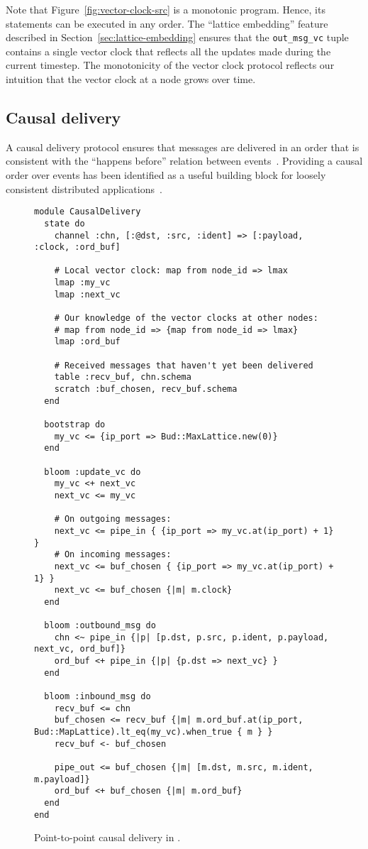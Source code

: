 Note that Figure~\ref{fig:vector-clock-src} is a monotonic program. Hence, its
statements can be executed in any order. The ``lattice embedding'' feature
described in Section~\ref{sec:lattice-embedding} ensures that the
\texttt{out\_msg\_vc} tuple contains a single vector clock that reflects all the
updates made during the current timestep. The monotonicity of the vector clock
protocol reflects our intuition that the vector clock at a node grows over
time.%

\subsection{Causal delivery}
A causal delivery protocol ensures that messages are delivered in an order that
is consistent with the ``happens before'' relation between
events~\cite{Lamport1978}. Providing a causal order over events has been
identified as a useful building block for loosely consistent distributed
applications~\cite{Lloyd2011}.

\begin{figure}[t]
\begin{scriptsize}
\begin{lstlisting}
module CausalDelivery
  state do
    channel :chn, [:@dst, :src, :ident] => [:payload, :clock, :ord_buf]

    # Local vector clock: map from node_id => lmax
    lmap :my_vc
    lmap :next_vc

    # Our knowledge of the vector clocks at other nodes:
    # map from node_id => {map from node_id => lmax}
    lmap :ord_buf

    # Received messages that haven't yet been delivered
    table :recv_buf, chn.schema
    scratch :buf_chosen, recv_buf.schema
  end

  bootstrap do
    my_vc <= {ip_port => Bud::MaxLattice.new(0)}
  end

  bloom :update_vc do
    my_vc <+ next_vc
    next_vc <= my_vc

    # On outgoing messages:
    next_vc <= pipe_in { {ip_port => my_vc.at(ip_port) + 1} }
    # On incoming messages:
    next_vc <= buf_chosen { {ip_port => my_vc.at(ip_port) + 1} }
    next_vc <= buf_chosen {|m| m.clock}
  end

  bloom :outbound_msg do
    chn <~ pipe_in {|p| [p.dst, p.src, p.ident, p.payload, next_vc, ord_buf]}
    ord_buf <+ pipe_in {|p| {p.dst => next_vc} }
  end

  bloom :inbound_msg do
    recv_buf <= chn
    buf_chosen <= recv_buf {|m| m.ord_buf.at(ip_port, Bud::MapLattice).lt_eq(my_vc).when_true { m } }
    recv_buf <- buf_chosen

    pipe_out <= buf_chosen {|m| [m.dst, m.src, m.ident, m.payload]}
    ord_buf <+ buf_chosen {|m| m.ord_buf}
  end
end
\end{lstlisting}
\end{scriptsize}
\caption{Point-to-point causal delivery in \lang.}
\label{fig:causal-delivery-src}
\end{figure}
